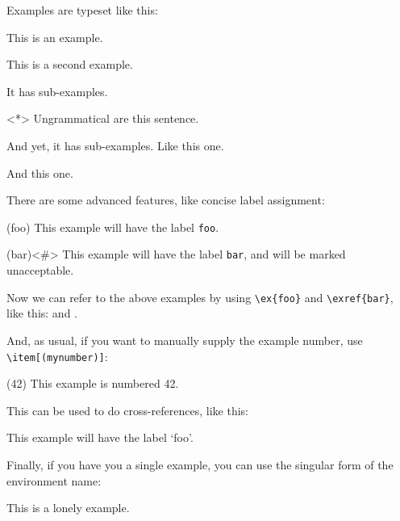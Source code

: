 \documentclass{article}
\begin{document}
%
\noindent Examples are typeset like this:
    \begin{examples}
        \item This is an example.
        \item This is a second example.
              \begin{examples}
                  \item It has sub-examples.
                  \item<*> Ungrammatical are this sentence.
                        \begin{examples}
                            \item And yet, it has sub-examples. Like this one.
                            \item And this one.
                        \end{examples}
              \end{examples}
    \end{examples}
There are some advanced features, like concise label assignment:
\begin{examples}
   \item \begin{examples}
        \item(foo) This example will have the label \verb|foo|.
        \item(bar)<\#> This example will have the label \verb|bar|, and will be marked 
                unacceptable.
    \end{examples} 
    
\end{examples}
%
Now we can refer to the above examples by using \verb|\ex{foo}| and \verb|\exref{bar}|, like this:  and .

And, as usual, if you want to manually supply the example number, use \verb|\item[(mynumber)]|:
\begin{examples}
    \item[(42)] This example is numbered 42.
\end{examples}

This can be used to do cross-references, like this:
\begin{examples}
    \item[\ex{foo}] This example will have the label `foo'.
\end{examples}
%
%
Finally, if you have you a single example, you can use the singular form of the environment name:
\begin{example}
    \item This is a lonely example.
\end{example}
\end{document}
